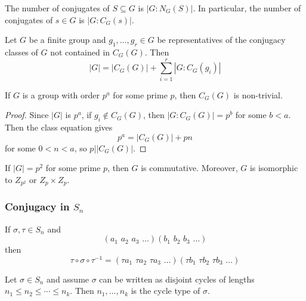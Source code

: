 \documentclass[a5paper]{article}
\begin{document}
\begin{theorem}
	The number of conjugates of $S\subseteq G$ is $|G:N_G(S)|$. In particular, the
  number of conjugates of $s\in G$ is $|G:C_G(s)|$.
\end{theorem}

\begin{theorem}
	Let $G$ be a finite group and $g_1,\ldots,g_r\in G$ be representatives of the
  conjugacy classes of $G$ not contained in $C_G(G)$. Then
  \begin{equation*}
    |G|=|C_G(G)|+\sum_{i=1}^r|G:C_G(g_i)|
  \end{equation*}
\end{theorem}

\begin{theorem}
	If $G$ is a group with order $p^a$ for some prime $p$, then $C_G(G)$ is
  non-trivial. 
\end{theorem}
\begin{proof}
  Since $|G|$ is $p^a$, if $g_i\notin C_G(G)$, then $|G:C_G(G)|=p^b$ for some
  $b<a$. Then the class equation gives %
  \begin{equation*}
    p^a=|C_G(G)|+pn
  \end{equation*}
  for some $0<n<a$, so $p\big||C_G(G)|$.
\end{proof}

\begin{corollary}
  If $|G|=p^2$ for some prime $p$, then $G$ is commutative. Moreover, $G$ is
  isomorphic to $Z_{p^2}$ or $Z_p\times Z_p$.
\end{corollary}

\subsubsection{Conjugacy in $S_n$}
\begin{lemma}
	If $\sigma,\tau\in S_n$ and 
  \begin{equation*}
    (a_1\,\,a_2\,\,a_3\,\,\ldots)(b_1\,\,b_2\,\,b_3\,\,\ldots)
  \end{equation*}
  then 
  \begin{equation*}
    \tau\circ\sigma\circ\tau^{-1}
    =(\tau a_1\,\,\tau a_2\,\,\tau a_3\,\,\ldots)(\tau b_1\,\,\tau b_2\,\,\tau b_3\,\,\ldots)
  \end{equation*}
\end{lemma}

\begin{definition*}
  Let $\sigma\in S_n$ and assume $\sigma$ can be written as disjoint cycles of
  lengths $n_1\leq n_2\leq\cdots\leq n_k$. Then $n_1,\ldots,n_k$ is the cycle
  type of $\sigma$.
\end{definition*}
\end{document}

